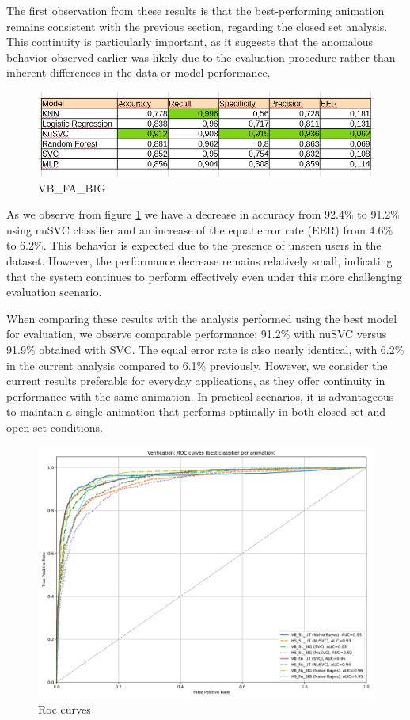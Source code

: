 \documentclass{article}
\begin{document}
The first observation from these results is that the best-performing animation remains consistent with the previous section, regarding the closed set analysis.
This continuity is particularly important, as it suggests that the anomalous behavior observed earlier was likely due to the evaluation procedure rather than inherent differences in the data or model performance.

\begin{figure}[ht]
    \centering
    \includegraphics[width = 0.8
    \textwidth]{Images/Results/Classic_procedure/Verification_intruders/st/VB_FA_BIG.png}
    \caption{VB\_FA\_BIG}
    \label{fig:VB_FA_BIG_cist}
\end{figure}

As we observe from figure \ref{fig:VB_FA_BIG_cist} we have a decrease in accuracy from 92.4\% to 91.2\% using nuSVC classifier and an increase of the equal error rate (EER) from 4.6\% to 6.2\%.
This behavior is expected due to the presence of unseen users in the dataset.
However, the performance decrease remains relatively small, indicating that the system continues to perform effectively even under this more challenging evaluation scenario.

When comparing these results with the analysis performed using the best model for evaluation, we observe comparable performance: 91.2\% with nuSVC versus 91.9\% obtained with SVC. 
The equal error rate is also nearly identical, with 6.2\% in the current analysis compared to 6.1\% previously. 
However, we consider the current results preferable for everyday applications, as they offer continuity in performance with the same animation. 
In practical scenarios, it is advantageous to maintain a single animation that performs optimally in both closed-set and open-set conditions.

\begin{figure}[ht]
    \centering
    \includegraphics[width = 0.6
    \textwidth]{Images/Results/Classic_procedure/Verification_intruders/st/Verification_single_intruders_roc_two_st.png}
    \caption{Roc curves}
    \label{fig:roc_cist}
\end{figure}
\end{document}

